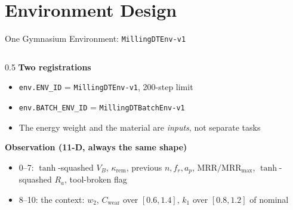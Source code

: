\documentclass[11pt,aspectratio=169]{beamer}
\newcommand{\MRR}{\mathrm{MRR}}
\newcommand{\Ra}{R_a}
\newcommand{\VB}{V_B}
\begin{document}
\section{Environment Design}

\begin{frame}{One Gymnasium Environment: \texttt{MillingDTEnv-v1}}
    \footnotesize
    \begin{columns}[T]
        \begin{column}{0.5\textwidth}
            \textbf{Two registrations}
            \begin{itemize}
                \item \texttt{env.ENV\_ID} = \texttt{MillingDTEnv-v1}, 200-step limit
                \item \texttt{env.BATCH\_ENV\_ID} = \texttt{MillingDTBatchEnv-v1}
                \item The energy weight and the material are \emph{inputs}, not separate tasks
            \end{itemize}

            \textbf{Observation (11-D, always the same shape)}
            \begin{itemize}
                \item 0--7: $\tanh$-squashed $\VB$, $\kappa_{\text{rem}}$, previous $n, f_r, a_p$,
                      $\MRR/\MRR_{\text{max}}$, $\tanh$-squashed $\Ra$, tool-broken flag
                \item 8--10: the context: $w_2$, $C_\text{wear}$ over $[0.6,1.4]$,
                      $k_1$ over $[0.8,1.2]$ of nominal
            \end{itemize}


\end{column}
\end{columns}
\end{frame}
\end{document}
